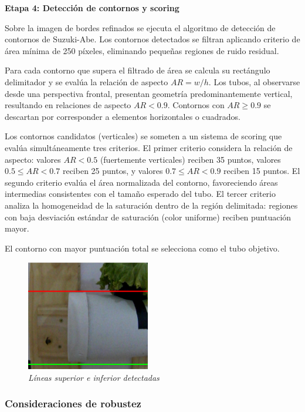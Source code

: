 \textbf{Etapa 4: Detección de contornos y scoring}

Sobre la imagen de bordes refinados se ejecuta el algoritmo de detección de contornos de Suzuki-Abe. Los contornos detectados se filtran aplicando criterio de área mínima de 250 píxeles, eliminando pequeñas regiones de ruido residual.

Para cada contorno que supera el filtrado de área se calcula su rectángulo delimitador y se evalúa la relación de aspecto $AR = w/h$. Los tubos, al observarse desde una perspectiva frontal, presentan geometría predominantemente vertical, resultando en relaciones de aspecto $AR < 0.9$. Contornos con $AR \geq 0.9$ se descartan por corresponder a elementos horizontales o cuadrados.

Los contornos candidatos (verticales) se someten a un sistema de scoring que evalúa simultáneamente tres criterios. El primer criterio considera la relación de aspecto: valores $AR < 0.5$ (fuertemente verticales) reciben 35 puntos, valores $0.5 \leq AR < 0.7$ reciben 25 puntos, y valores $0.7 \leq AR < 0.9$ reciben 15 puntos. El segundo criterio evalúa el área normalizada del contorno, favoreciendo áreas intermedias consistentes con el tamaño esperado del tubo. El tercer criterio analiza la homogeneidad de la saturación dentro de la región delimitada: regiones con baja desviación estándar de saturación (color uniforme) reciben puntuación mayor.

El contorno con mayor puntuación total se selecciona como el tubo objetivo.

\begin{figure}[H]
    \centering
    \includegraphics[width=0.48\textwidth]{imagenes/detector_tubos_6_lineas.png}
    \caption{\textit{Líneas superior e inferior detectadas}}
    \label{fig:detector_tubos_lineas}
\end{figure}

\subsubsection{Consideraciones de robustez}

